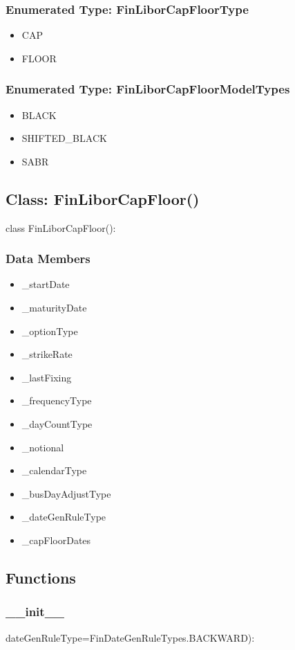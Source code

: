 \documentclass[twoside,11pt]{book}
\begin{document}
\subsubsection{Enumerated Type: FinLiborCapFloorType}
\begin{itemize}
\item{CAP}
\item{FLOOR}
\end{itemize}

\subsubsection{Enumerated Type: FinLiborCapFloorModelTypes}
\begin{itemize}
\item{BLACK}
\item{SHIFTED\_BLACK}
\item{SABR}
\end{itemize}

\subsection*{Class: FinLiborCapFloor()}
class FinLiborCapFloor(): 

\subsubsection*{Data Members}
\begin{itemize}
\item{\_startDate}
\item{\_maturityDate}
\item{\_optionType}
\item{\_strikeRate}
\item{\_lastFixing}
\item{\_frequencyType}
\item{\_dayCountType}
\item{\_notional}
\item{\_calendarType}
\item{\_busDayAdjustType}
\item{\_dateGenRuleType}
\item{\_capFloorDates}
\end{itemize}

\subsection*{Functions}

\subsubsection*{{\bf \_\_init\_\_}}
dateGenRuleType=FinDateGenRuleTypes.BACKWARD): 
\end{document}
